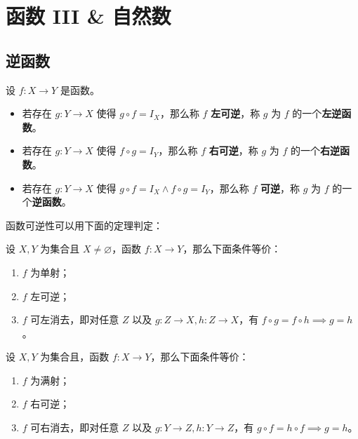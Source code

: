 \section{函数 III \& 自然数}

\subsection{逆函数}

\begin{definition}
    设 $f: X \to Y$ 是函数。
    \begin{itemize}
        \item 若存在 $g: Y \to X$ 使得 $g \circ f = I_X$，那么称 $f$ \textbf{左可逆}，称 $g$ 为 $f$ 的一个\textbf{左逆函数}。
        \item 若存在 $g: Y \to X$ 使得 $f \circ g = I_Y$，那么称 $f$ \textbf{右可逆}，称 $g$ 为 $f$ 的一个\textbf{右逆函数}。
        \item 若存在 $g: Y \to X$ 使得 $g \circ f = I_X \land f \circ g = I_Y$，那么称 $f$ \textbf{可逆}，称 $g$ 为 $f$ 的一个\textbf{逆函数}。
    \end{itemize}
\end{definition}

函数可逆性可以用下面的定理判定：

\begin{theorem}
    设 $X, Y$ 为集合且 $X \neq \varnothing$，函数 $f: X \to Y$，那么下面条件等价：
    \begin{enumerate}
        \item $f$ 为单射；
        \item $f$ 左可逆；
        \item $f$ 可左消去，即对任意 $Z$ 以及 $g: Z \to X, h: Z \to X$，有 $f \circ g = f \circ h \implies g = h$。
    \end{enumerate}
\end{theorem}

\begin{theorem}
    设 $X, Y$ 为集合且，函数 $f: X \to Y$，那么下面条件等价：
    \begin{enumerate}
        \item $f$ 为满射；
        \item $f$ 右可逆；
        \item $f$ 可右消去，即对任意 $Z$ 以及 $g: Y \to Z, h: Y \to Z$，有 $g \circ f = h \circ f \implies g = h$。
    \end{enumerate}
\end{theorem}

